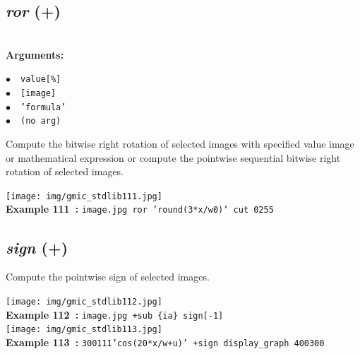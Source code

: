\documentclass[a4paper,10.5pt,twoside]{book}
\def\comma{\discretionary{,}{}{,}}
\newcommand{\Cb}[1]{\textcolor{cb}{#1}}
\begin{document}
\subsection{\emph{ror} (+)}\vspace*{-0.7em}
~\\\textbf{\Cb{Arguments: }}\begin{flushleft}
{\small \Cb{\hspace*{0.5cm}$\bullet$~~\texttt{value[\%]}}}~~~\\
{\small \Cb{\hspace*{0.5cm}$\bullet$~~\texttt{[image]}}}~~~\\
{\small \Cb{\hspace*{0.5cm}$\bullet$~~\texttt{'formula'}}}~~~\\
{\small \Cb{\hspace*{0.5cm}$\bullet$~~\texttt{(no arg)}}}\end{flushleft}
Compute the bitwise right rotation of selected images with specified value{\comma} image or
mathematical expression{\comma} or compute the pointwise sequential bitwise right rotation of
selected images.
\begin{center}\texttt{[image: img/gmic\_stdlib111.jpg]}\\
{\footnotesize \textbf{Example 111~:} \texttt{image.jpg ror 'round(3*x/w{\comma}0)' cut 0{\comma}255}}
\end{center}

\subsection{\emph{sign} (+)}\vspace*{-0.7em}
Compute the pointwise sign of selected images.
\begin{center}\texttt{[image: img/gmic\_stdlib112.jpg]}\\
{\footnotesize \textbf{Example 112~:} \texttt{image.jpg +sub \{ia\} sign[-1]}}
\\\texttt{[image: img/gmic\_stdlib113.jpg]}\\
{\footnotesize \textbf{Example 113~:} \texttt{300{\comma}1{\comma}1{\comma}1{\comma}'cos(20*x/w+u)' +sign display\_graph 400{\comma}300}}
\end{center}
\end{document}
